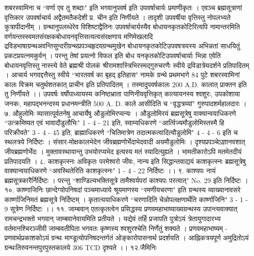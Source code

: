 शबरस्वामिना च ``वर्णा एव तु शब्दाः" इति भगवानुपवर्ष इति उपवर्षाचार्यः प्रमाणीकृतः । एवञ्च ब्रह्मसूत्राणां वृत्तिकार उपवर्षाचार्य अद्वैतमतैकदेशी प्र. चीन इति निर्णीयते । तादृशी उपवर्षीया वृत्तिस्तु नोपलभ्यते कुत्रापीदानीम् ।
ग्रन्थानुपलव्धेरेव विशिष्टाद्वैतिनः उपवर्षाचार्यस्यैव बोधायनकृतकोटिरित्यपि नामान्तरमिति वर्णयन्तस्स्वमतसंरक्षकबोधायनवृत्तिसत्यत्वसंरक्षणाय मणिमेखलादि द्रविडभाषाग्रन्थअवन्तिसुन्दरीग्रन्थप्रपञ्चहृदयग्रन्थमुखेन बोधायनकृतकोटिउपवषत्रयस्य अभिन्नतां साधयितुं प्रकटप्रयत्नमकुर्वन् । परन्तु तेषां प्रयत्नो विफल इति बोध यनकृतकोटिउपवर्षाचार्याः भिन्ना एवेति बोधायनवृत्तिस्तु नास्त्त्ये वेते ब्रह्मश्री पोलकं श्रीरामशास्त्रिभिरस्मद्गुरुचरणैः स्वीये द्रविडात्रेयदर्शने प्रतिपादितम् ।
आचार्य भगवद्दत्तैस्तु स्वीये ``भारतवर्ष का बृहद् इतिहास" नामके ग्रन्थे प्रथमभागे 84 पुटे शबरस्वामिनां कालः विक्रम चतुर्थशतकात् प्राचीन इति प्रतिपादितम् । तस्मादुपवर्षकालः 200 A.D. कालात् प्राक्तन इति तु निर्णीयते ।।
उपवर्षः वर्षोपाध्यायस्य कनिष्ठभ्राता पाणिनीयवृत्तिकृत् कात्यायनस्य श्वशुरः, उपकोशाया जनकः, महापद्भनन्दस्य प्रधानमन्त्रीति 500 A. D. काले आसीदिति च ``वृद्धत्रय्यां" गुरुपादशर्महालदारः ।
७. औहुलोमिः
व्यासात्पूर्वतनेषु आचार्येषु औडुलोमिरप्यन्यः । औडुलोमिरयं ब्रह्मसूत्रेषु वाक्यान्वयाधिकरणे ``उत्क्रमिष्यत एवं भावादौडुलौभिः" 1 - 4 - 21 इति, स्वाम्यधिकरणे ``आर्त्विज्यमौडुलोमिस्तस्मै हि परिक्रीयते" 3 - 4 - 45 इति, ब्राह्माधिकरणे ``चितिमात्रेण तदात्मकत्वादित्यौडुलोमि" 4 - 4 - 6 इति च स्थलत्रये निर्दिष्टः ।
संसार-मोक्षकालभेदेन जीवब्रह्मणोर्भेदाभेदवादी अयमौडुलोमिः । दृश्यप्रपञ्चेऽज्ञानवशात् जीवब्रह्मणोर्भेदः । मुक्तावस्थायान्तु उभयोरप्यभेद इत्यस्य मतं स्यादित्युह्यते । भामतीकारोऽपि मतमेतदीयं प्रतिपादयति । 
८. काशकृत्स्नः
अविकृतः परमेश्वरो जीवः, नान्य इति सिद्धान्तवाद्ययं काशकृत्स्नः ब्रह्मसूत्रेषु वाक्यान्वयाधिकरणे ``अवस्थितेरिति काशकृत्स्नः" 1 - 4 - 22 निर्दिष्टः ।।
९. काश्यपः
नायं ब्रह्मसूत्रकारैर्निर्दिष्टः । परन्तु ``शाण्डिल्यभक्तिसूत्रे तामैश्वर्यपरां काश्यपः परत्वात्" No. 29 इति निर्दिष्टः ।
१०. काष्णाजिनिः
छान्देग्योपनिषदां पञ्चमाध्याये श्रूयमाणस्य ``रमणीयचरणा" इति ग्रन्थस्य व्याख्यानावसरे कार्ष्णाजिनिमतं ब्रह्मसूत्रे निर्दिष्टम् । कृतात्ययाधिकरणे ``चरणादिति चेन्नोपलक्षणार्थेति कार्ष्णाजिनि" 3 - 1 - 9 सूत्रेण निर्दिष्टः ।।
११. जाम्बवान्
एतत्कृतत्वेन प्रसिद्धस्य प्रणवमहाभाष्याख्यग्रन्थस्य उपान्त्यवाक्यात् रामचन्द्रभक्तो भगवान् जाम्बवानेवायमिति प्रतीयते । यद्येवं तर्हि प्रजापति पुत्रोऽयं त्रेतायुगादारभ्य वर्तमानश्चिरञ्जीवी जाम्बवतीपिता भगवतः कृष्णस्य श्वशुरश्चेति निर्णेतुं शक्यते ।
प्रणवमहाभाष्यम् -
प्रणवार्थप्रकाशकोऽयं ग्रन्थः माण्डूत्योपनिषदन्तर्गतं ओङ्कारोपासनार्थ प्रदर्शयति । आह्निकत्रयपूर्ण अमुद्रितोऽयं ग्रन्थःतिरुवनन्तपुरपुस्तकालये 306 TCD दृश्यते ।।
१२.जैमिनिः
